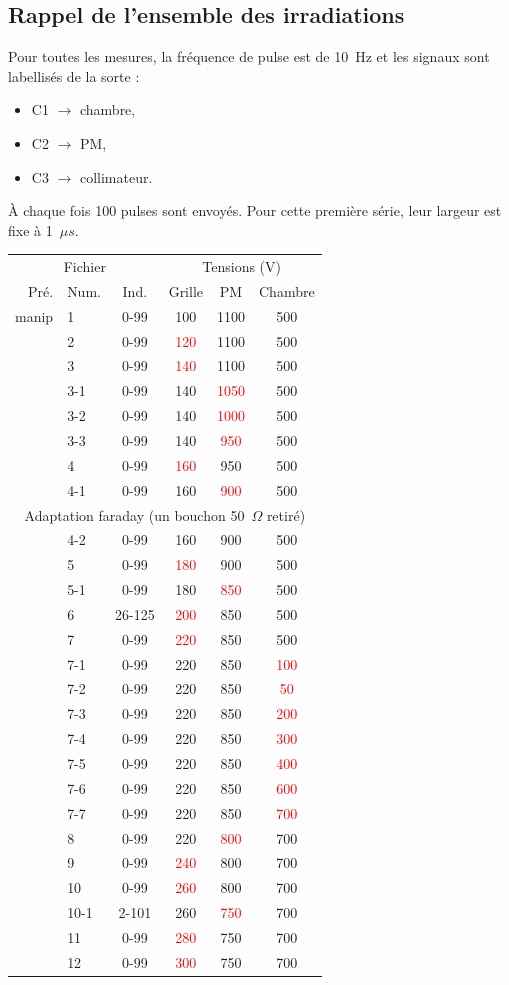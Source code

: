 \documentclass[a4paper,11pt]{article}
\begin{document}
\subsection*{Rappel de l'ensemble des irradiations}
Pour toutes les mesures, la fréquence de pulse est de 10~Hz et les signaux sont labellisés de la sorte :
\begin{itemize}
\item C1 $\rightarrow$ chambre,
\item C2 $\rightarrow$ PM,
\item C3 $\rightarrow$ collimateur.
\end{itemize} 
\`A chaque fois 100 pulses sont envoyés.
Pour cette première série, leur largeur est fixe à 1~$\mu s$.
\begin{center}
\begin{tabular}{rlcccc}
\multicolumn{3}{c}{Fichier}&\multicolumn{3}{c}{Tensions (V)}\\
Pré.&Num.&Ind.&Grille&PM&Chambre\\
\hline
\hline
manip&1&0-99&100&1100&500\\
&2&0-99&\textcolor{red}{120}&1100&500\\
&3&0-99&\textcolor{red}{140}&1100&500\\
&3-1&0-99&140&\textcolor{red}{1050}&500\\
&3-2&0-99&140&\textcolor{red}{1000}&500\\
&3-3&0-99&140&\textcolor{red}{950}&500\\
&4&0-99&\textcolor{red}{160}&950&500\\
&4-1&0-99&160&\textcolor{red}{900}&500\\
\multicolumn{6}{c}{Adaptation faraday (un bouchon 50~$\Omega$ retiré)}\\
&4-2&0-99&160&900&500\\
&5&0-99&\textcolor{red}{180}&900&500\\
&5-1&0-99&180&\textcolor{red}{850}&500\\
&6&26-125&\textcolor{red}{200}&850&500\\
&7&0-99&\textcolor{red}{220}&850&500\\
&7-1&0-99&220&850&\textcolor{red}{100}\\
&7-2&0-99&220&850&\textcolor{red}{50}\\
&7-3&0-99&220&850&\textcolor{red}{200}\\
&7-4&0-99&220&850&\textcolor{red}{300}\\
&7-5&0-99&220&850&\textcolor{red}{400}\\
&7-6&0-99&220&850&\textcolor{red}{600}\\
&7-7&0-99&220&850&\textcolor{red}{700}\\
&8&0-99&220&\textcolor{red}{800}&700\\
&9&0-99&\textcolor{red}{240}&800&700\\
&10&0-99&\textcolor{red}{260}&800&700\\
&10-1&2-101&260&\textcolor{red}{750}&700\\
&11&0-99&\textcolor{red}{280}&750&700\\
&12&0-99&\textcolor{red}{300}&750&700\\
\hline
\end{tabular}
\end{center}
\end{document}
